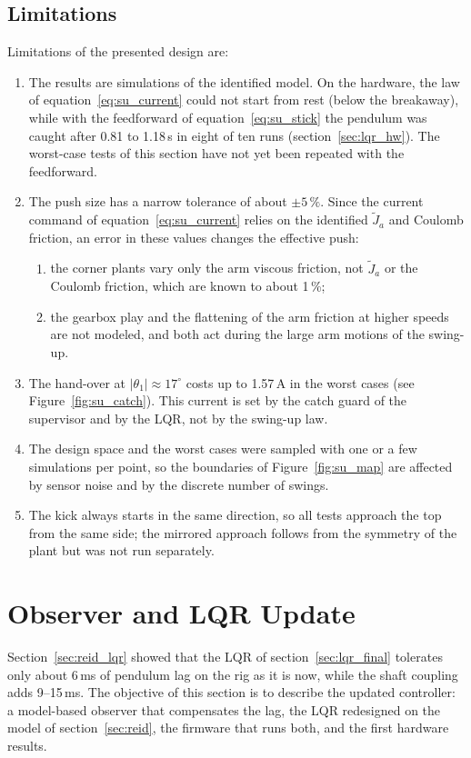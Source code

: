 \documentclass[a4paper,11pt]{article}
\begin{document}
\subsection{Limitations}
Limitations of the presented design are:
\begin{enumerate}
  \item The results are simulations of the identified model. On the hardware, the law of equation~\ref{eq:su_current} could not start from rest (below the breakaway), while with the feedforward of equation~\ref{eq:su_stick} the pendulum was caught after 0.81 to 1.18\,s in eight of ten runs (section~\ref{sec:lqr_hw}). The worst-case tests of this section have not yet been repeated with the feedforward.
  \item The push size has a narrow tolerance of about $\pm 5\,\%$. Since the current command of equation~\ref{eq:su_current} relies on the identified $\tilde J_a$ and Coulomb friction, an error in these values changes the effective push:
  \begin{enumerate}
    \item the corner plants vary only the arm viscous friction, not $\tilde J_a$ or the Coulomb friction, which are known to about 1\,\%;
    \item the gearbox play and the flattening of the arm friction at higher speeds are not modeled, and both act during the large arm motions of the swing-up.
  \end{enumerate}
  \item The hand-over at $|\theta_1| \approx 17^\circ$ costs up to 1.57\,A in the worst cases (see Figure~\ref{fig:su_catch}). This current is set by the catch guard of the supervisor and by the LQR, not by the swing-up law.
  \item The design space and the worst cases were sampled with one or a few simulations per point, so the boundaries of Figure~\ref{fig:su_map} are affected by sensor noise and by the discrete number of swings.
  \item The kick always starts in the same direction, so all tests approach the top from the same side; the mirrored approach follows from the symmetry of the plant but was not run separately.
\end{enumerate}

\section{Observer and LQR Update}
\label{sec:cu}
Section~\ref{sec:reid_lqr} showed that the LQR of section~\ref{sec:lqr_final} tolerates only about 6\,ms of pendulum lag on the rig as it is now, while the shaft coupling adds 9--15\,ms. The objective of this section is to describe the updated controller: a model-based observer that compensates the lag, the LQR redesigned on the model of section~\ref{sec:reid}, the firmware that runs both, and the first hardware results.
\end{document}
